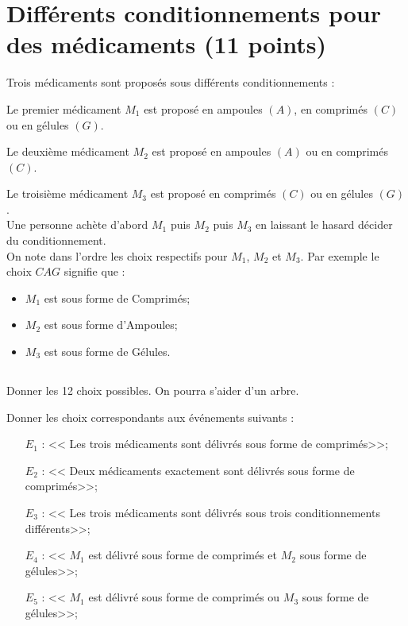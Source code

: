 \section{Différents conditionnements pour des médicaments (11 points)}

Trois médicaments sont proposés sous différents conditionnements :


Le premier médicament $M_1$ est proposé en ampoules $(A)$, en comprimés $(C)$ ou en gélules $(G)$.

Le deuxième médicament $M_2$ est proposé en ampoules $(A)$ ou en comprimés $(C)$.

Le troisième médicament $M_3$ est proposé en comprimés $(C)$ ou en gélules $(G)$.\\

Une personne achète d'abord $M_1$ puis $M_2$ puis $M_3$ en laissant le hasard décider du conditionnement.\\


On note dans l'ordre les choix respectifs pour $M_1$, $M_2$ et $M_3$.
Par exemple le choix $CAG$ signifie que :
\begin{itemize}
	\item $M_1$ est sous forme de Comprimés;
	\item $M_2$ est sous forme d'Ampoules;	
	\item $M_3$ est sous forme de Gélules.
\end{itemize}

\subsection{}
\begin{questions}
	\question[2] Donner les 12 choix possibles. On pourra s'aider d'un arbre.
	
	\question[5] Donner les choix correspondants aux événements suivants :
	
	\begin{itemize}
		\item[$E_1$ :]  << Les trois médicaments sont délivrés sous forme de comprimés>>;
		\item[$E_2$ :] << Deux médicaments exactement sont délivrés sous forme de comprimés>>;
		\item[$E_3$ :] << Les trois médicaments sont délivrés sous trois conditionnements différents>>;
		\item[$E_4$ :] << $M_1$ est délivré sous forme de comprimés et $M_2$ sous forme de gélules>>;
		\item[$E_5$ :] << $M_1$ est délivré sous forme de comprimés ou $M_3$ sous forme de gélules>>;
	\end{itemize}
\end{questions}

